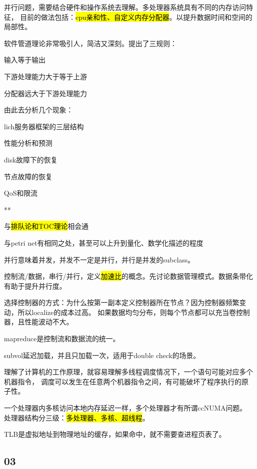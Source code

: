 并行问题，需要结合硬件和操作系统去理解。多处理器系统具有不同的内存访问特征，
目前的做法包括：\hl{cpu亲和性、自定义内存分配器}。以提升数据时间和空间的局部性。

软件管道理论非常吸引人，简洁又深刻。提出了三规则：
\begin{enumbox}
\item 输入等于输出
\item 下游处理能力大于等于上游
\item 分配器远大于下游处理能力
\end{enumbox}

由此去分析几个现象：
\begin{enumbox}
\item lich服务器框架的三层结构
\item 性能分析和预测
\item disk故障下的恢复
\item 节点故障的恢复
\item QoS和限流
\item ***
\item 与\hl{排队论和TOC理论}相会通
\item 与petri net有相同之处，甚至可以上升到量化、数学化描述的程度
\end{enumbox}

并行意味着并发，并发不一定是并行，并行是并发的subclass。

控制流/数据，串行/并行，定义\hl{加速比}的概念。先讨论数据管理模式。数据条带化有助于提升并行度。

选择控制器的方式：为什么按第一副本定义控制器所在节点？因为控制器频繁变动，所以localize的成本过高。
如果数据均匀分布，则每个节点都可以充当卷控制器，且性能波动不大。

mapreduce是控制流和数据流的统一。

subvol延迟加载，并且只加载一次，适用于double check的场景。

理解了计算机的工作原理，就容易理解多线程调度情况下，一个语句可能对应多个机器指令，
调度可以发生在任意两个机器指令之间，有可能破坏了程序执行的原子性。

一个处理器内多核访问本地内存延迟一样，多个处理器才有所谓ccNUMA问题。
处理器结构分三级：\hl{多处理器、多核、超线程}。

TLB是虚拟地址到物理地址的缓存，如果命中，就不需要查进程页表了。

\subsection{03}

